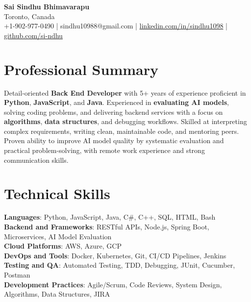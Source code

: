 \documentclass[letterpaper,11pt]{article}
\begin{document}
\begin{center}
  {\Large \textbf{Sai Sindhu Bhimavarapu}} \\
  Toronto, Canada \\
  +1-902-977-0490 \enspace | \enspace sindhu10988@gmail.com \enspace | \enspace \href{https://www.linkedin.com/in/sindhu1098/}{linkedin.com/in/sindhu1098} \enspace | \enspace \href{https://github.com/si-ndhu}{github.com/si-ndhu}
\end{center}

\section{Professional Summary}
  \begin{itemize}[leftmargin=0.15in, label={}]
    \small{\item{
     Detail-oriented \textbf{Back End Developer} with 5+ years of experience proficient in \textbf{Python}, \textbf{JavaScript}, and \textbf{Java}. Experienced in \textbf{evaluating AI models}, solving coding problems, and delivering backend services with a focus on \textbf{algorithms}, \textbf{data structures}, and debugging workflows. Skilled at interpreting complex requirements, writing clean, maintainable code, and mentoring peers. Proven ability to improve AI model quality by systematic evaluation and practical problem-solving, with remote work experience and strong communication skills.
    }}
  \end{itemize}
\vspace{-16pt}

\section{Technical Skills}
 \begin{itemize}[leftmargin=0.15in, label={}]
    \small{\item{
     \textbf{Languages}: Python, JavaScript, Java, C\#, C++, SQL, HTML, Bash \\
     \textbf{Backend and Frameworks}: RESTful APIs, Node.js, Spring Boot, Microservices, AI Model Evaluation \\
     \textbf{Cloud Platforms}: AWS, Azure, GCP \\
     \textbf{DevOps and Tools}: Docker, Kubernetes, Git, CI/CD Pipelines, Jenkins \\
     \textbf{Testing and QA}: Automated Testing, TDD, Debugging, JUnit, Cucumber, Postman \\
     \textbf{Development Practices}: Agile/Scrum, Code Reviews, System Design, Algorithms, Data Structures, JIRA
    }}
 \end{itemize}
\vspace{-16pt}
\end{document}
